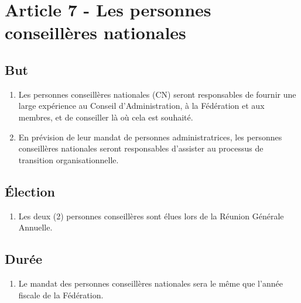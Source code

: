 \section{Article 7 - Les personnes conseillères nationales}
\label{article-7-les-personnes-conseilleres-nationales}

\subsection{But}
\label{but-1}

\begin{enumerate}
 \item
  Les personnes conseillères nationales (CN) seront responsables de fournir une large expérience au Conseil d'Administration, à la Fédération et aux membres, et de conseiller là où cela est souhaité.
 \item
  En prévision de leur mandat de personnes administratrices, les personnes conseillères nationales seront responsables d'assister au processus de transition organisationnelle.
\end{enumerate}

\subsection{Élection}
\label{election-2}

\begin{enumerate}
 \item
  Les deux (2) personnes conseillères sont élues lors de la Réunion Générale Annuelle.
\end{enumerate}

\subsection{Durée}
\label{duree-3}

\begin{enumerate}
 \item
  Le mandat des personnes conseillères nationales sera le même que l'année fiscale de la Fédération.
\end{enumerate}
